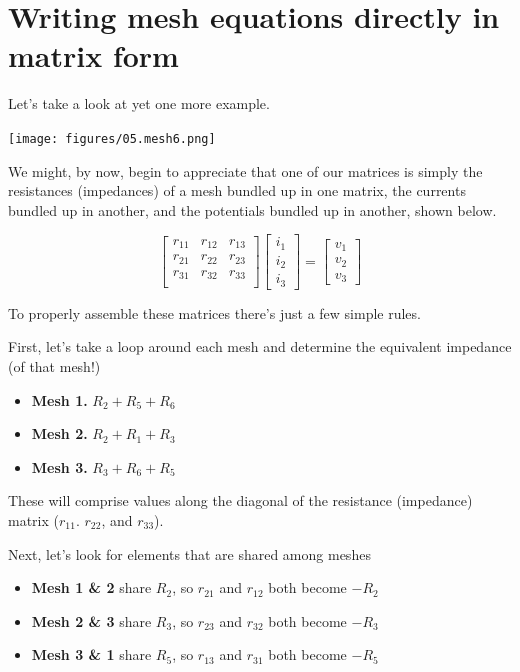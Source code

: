 \documentclass[11pt]{book}
\begin{document}
\section{Writing mesh equations directly in matrix form}
Let's take a look at yet one more example.
\begin{center}
	\texttt{[image: figures/05.mesh6.png]}
\end{center}

We might, by now, begin to appreciate that one of our matrices is simply the resistances (impedances) of a mesh bundled up in one matrix, the currents bundled up in another, and the potentials bundled up in another, shown below.

\begin{equation}
	\begin{bmatrix}
		r_{11} & r_{12} & r_{13} \\
		r_{21} & r_{22} & r_{23} \\
		r_{31} & r_{32} & r_{33} \\
	\end{bmatrix}
	\begin{bmatrix}
		i_1 \\ i_2 \\ i_3
	\end{bmatrix}
	=
	\begin{bmatrix}
		v_1 \\ v_2 \\ v_3
	\end{bmatrix}
\end{equation}

To properly assemble these matrices there's just a few simple rules.


First, let's take a loop around each mesh and determine the equivalent impedance (of that mesh!)
\begin{itemize}
	\item \textbf{Mesh 1.} $R_2 + R_5 + R_6$
	\item \textbf{Mesh 2.} $R_2 + R_1 + R_3$
	\item \textbf{Mesh 3.} $R_3 + R_6 + R_5$
\end{itemize}

These will comprise values along the diagonal of the resistance (impedance) matrix ($r_{11}$. $r_{22}$, and $r_{33}$).

Next, let's look for elements that are shared among meshes
\begin{itemize}
	\item \textbf{Mesh 1 \& 2} share $R_2$, so $r_{21}$ and $r_{12}$ both become $-R_2$
	\item \textbf{Mesh 2 \& 3} share $R_3$, so $r_{23}$ and $r_{32}$ both become $-R_3$
	\item \textbf{Mesh 3 \& 1} share $R_5$, so $r_{13}$ and $r_{31}$ both become $-R_5$
\end{itemize}
\end{document}
